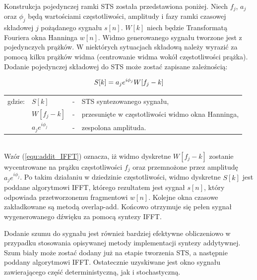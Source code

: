 


Konstrukcja pojedynczej ramki STS została przedstawiona poniżej. Niech $f_{j}$, $a_{j}$ oraz $\phi_{j}$ będą wartościami częstotliwości, amplitudy i fazy ramki czasowej składowej $j$ pożądanego sygnału $s[n]$. $W[k]$ niech będzie Transformatą Fouriera okna Hanninga $w[n]$. Widmo generowanego sygnału tworzone jest z pojedynczych prążków. W niektórych sytuacjach składową należy wyrazić za pomocą kilku prążków widma (centrowanie widma wokół częstotliwości prążka). Dodanie pojedynczej składowej do STS może zostać zapisane zależnością:

\begin{equation} \label{equ:addit_IFFT}
S[k] = a_{j}e^{i\phi_{j}}W[f_{j} - k] \\  
\end{equation}
\begin{tabular}{ l l l l}
	gdzie: & $S[k]$ &  - & STS syntezowanego sygnału, \\
	& $W[f_{j} - k]$ &  - & przesunięte w częstotliwości widmo okna Hanninga, \\
	& $a_{j}e^{i\phi_{j}}$ & - & zespolona amplituda. \\
\end{tabular} \\

Wzór (\ref{equ:addit_IFFT}) oznacza, iż widmo dyskretne $W[f_{j} - k]$ zostanie wycentrowane na prążku częstotliwości $f_{j}$ oraz przemnożone przez amplitudę $a_{j}e^{i\phi_{j}}$. Po takim działaniu w dziedzinie częstotliwości, widmo dyskretne $S[k]$ jest poddane algorytmowi IFFT, którego rezultatem jest sygnał $s[n]$, który odpowiada przetworzonemu fragmentowi $w[n]$. Kolejne okna czasowe zakładkowane są metodą overlap-add. Końcowo otrzymuje się pełen sygnał wygenerowanego dźwięku za pomocą syntezy IFFT.

Dodanie szumu do sygnału jest również bardziej efektywne obliczeniowo w przypadku stosowania opisywanej metody implementacji syntezy addytywnej. Szum biały może zostać dodany już na etapie tworzenia STS, a następnie poddany algorytmowi IFFT. Ostatecznie uzyskiwane jest okno sygnału zawierającego część deterministyczną, jak i stochastyczną.

